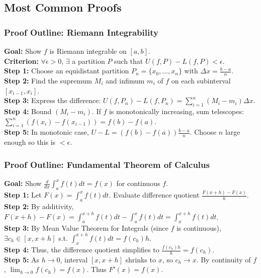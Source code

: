 \subsection{Most Common Proofs}

\subsubsection{Proof Outline: Riemann Integrability}
\textbf{Goal:} Show $f$ is Riemann integrable on $[a,b]$. \\
\textbf{Criterion:} $\forall \epsilon > 0$, $\exists$ a partition $P$ such that $U(f, P) - L(f, P) < \epsilon$. \\
\textbf{Step 1:} Choose an equidistant partition $P_n = \{x_0, \dots, x_n\}$ with $\Delta x = \frac{b-a}{n}$. \\
\textbf{Step 2:} Find the supremum $M_i$ and infimum $m_i$ of $f$ on each subinterval $[x_{i-1}, x_i]$. \\
\textbf{Step 3:} Express the difference: $U(f, P_n) - L(f, P_n) = \sum_{i=1}^n (M_i - m_i) \Delta x$. \\
\textbf{Step 4:} Bound $(M_i - m_i)$. If $f$ is monotonically increasing, sum telescopes: $\sum_{i=1}^n (f(x_i) - f(x_{i-1})) = f(b) - f(a)$. \\
\textbf{Step 5:} In monotonic case, $U - L = (f(b)-f(a))\frac{b-a}{n}$. Choose $n$ large enough so this is $< \epsilon$.

\subsubsection{Proof Outline: Fundamental Theorem of Calculus}
\textbf{Goal:} Show $\frac{d}{dx} \int_a^x f(t) dt = f(x)$ for continuous $f$. \\
\textbf{Step 1:} Let $F(x) = \int_a^x f(t) dt$. Evaluate difference quotient $\frac{F(x+h)-F(x)}{h}$. \\
\textbf{Step 2:} By additivity, $F(x+h) - F(x) = \int_a^{x+h} f(t) dt - \int_a^x f(t) dt = \int_x^{x+h} f(t) dt$. \\
\textbf{Step 3:} By Mean Value Theorem for Integrals (since $f$ is continuous), $\exists c_h \in [x, x+h]$ s.t. $\int_x^{x+h} f(t) dt = f(c_h)h$. \\
\textbf{Step 4:} Thus, the difference quotient simplifies to $\frac{f(c_h)h}{h} = f(c_h)$. \\
\textbf{Step 5:} As $h \to 0$, interval $[x, x+h]$ shrinks to $x$, so $c_h \to x$. By continuity of $f$, $\lim_{h \to 0} f(c_h) = f(x)$. Thus $F'(x) = f(x)$.


